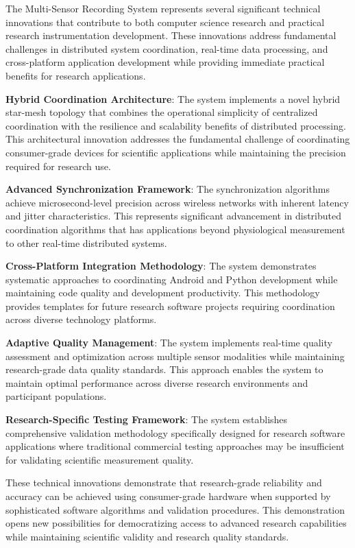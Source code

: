 \documentclass[11pt,a4paper]{report}
\begin{document}
The Multi-Sensor Recording System represents several significant technical innovations that contribute to both computer
science research and practical research instrumentation development. These innovations address fundamental challenges in
distributed system coordination, real-time data processing, and cross-platform application development while providing
immediate practical benefits for research applications.

\textbf{Hybrid Coordination Architecture}: The system implements a novel hybrid star-mesh topology that combines the
operational simplicity of centralized coordination with the resilience and scalability benefits of distributed
processing. This architectural innovation addresses the fundamental challenge of coordinating consumer-grade devices for
scientific applications while maintaining the precision required for research use.

\textbf{Advanced Synchronization Framework}: The synchronization algorithms achieve microsecond-level precision across
wireless networks with inherent latency and jitter characteristics. This represents significant advancement in
distributed coordination algorithms that has applications beyond physiological measurement to other real-time
distributed systems.

\textbf{Cross-Platform Integration Methodology}: The system demonstrates systematic approaches to coordinating Android and
Python development while maintaining code quality and development productivity. This methodology provides templates for
future research software projects requiring coordination across diverse technology platforms.

\textbf{Adaptive Quality Management}: The system implements real-time quality assessment and optimization across multiple
sensor modalities while maintaining research-grade data quality standards. This approach enables the system to maintain
optimal performance across diverse research environments and participant populations.

\textbf{Research-Specific Testing Framework}: The system establishes comprehensive validation methodology specifically
designed for research software applications where traditional commercial testing approaches may be insufficient for
validating scientific measurement quality.

These technical innovations demonstrate that research-grade reliability and accuracy can be achieved using
consumer-grade hardware when supported by sophisticated software algorithms and validation procedures. This
demonstration opens new possibilities for democratizing access to advanced research capabilities while maintaining
scientific validity and research quality standards.
\end{document}
